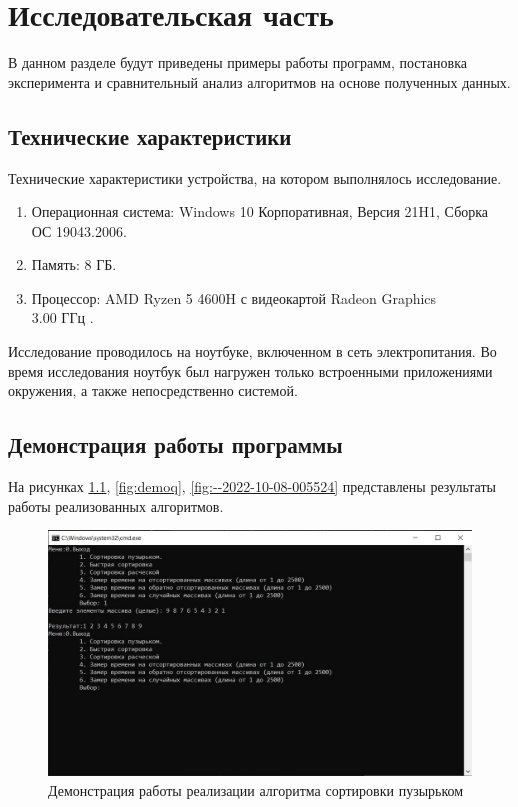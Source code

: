 \chapter{Исследовательская часть}

В данном разделе будут приведены примеры работы программ, постановка эксперимента и сравнительный анализ алгоритмов на основе полученных данных.

\section{Технические характеристики}

Технические характеристики устройства, на котором выполнялось исследование.

\begin{enumerate}
	\item Операционная система: Windows 10 Корпоративная, Версия	21H1, Сборка ОС 19043.2006.
	\item Память: 8 ГБ.
	\item Процессор: AMD Ryzen 5 4600H с видеокартой Radeon Graphics \\3.00 ГГц \cite{processor}.
\end{enumerate}

Исследование проводилось на ноутбуке, включенном в сеть электропитания. Во время исследования ноутбук был нагружен только встроенными приложениями окружения, а также непосредственно системой.

\section{Демонстрация работы программы}

На рисунках \ref{fig:demob}, \ref{fig:demoq}, \ref{fig:--2022-10-08-005524} представлены результаты работы реализованных алгоритмов.

\captionsetup{justification=centering, singlelinecheck=false}
\begin{figure}[H]
	\centering
	\includegraphics[width=1\linewidth]{inc/img/demob}
	\caption{Демонстрация работы реализации алгоритма сортировки пузырьком}
	\label{fig:demob}
\end{figure}

